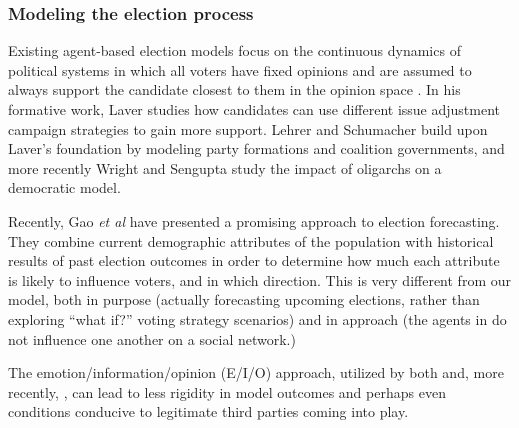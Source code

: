 


\subsubsection{Modeling the election process}

Existing agent-based election models focus on the continuous dynamics of
political systems in which all voters have fixed opinions and are assumed to 
always support the candidate closest to them in the opinion space \cite{kollman_adaptive_1992, laver_policy_2005, lehrer_governator_2018, wright_modeling_2015}. In his formative work, Laver \cite{laver_policy_2005} studies how candidates can use different issue adjustment
campaign strategies to gain more support. Lehrer and Schumacher \cite{lehrer_governator_2018} build upon Laver's foundation by modeling party formations and coalition governments, and more recently Wright and Sengupta \cite{wright_modeling_2015} study the impact of oligarchs on a democratic model.


Recently, Gao \textit{et al}\cite{gao_forecasting_2022} have presented a
promising approach to election forecasting. They combine current demographic
attributes of the population with historical results of past election outcomes
in order to determine how much each attribute is likely to influence voters,
and in which direction. This is very different from our model, both in purpose
(actually forecasting upcoming elections, rather than exploring ``what if?''
voting strategy scenarios) and in approach (the agents in
\cite{gao_forecasting_2022} do not influence one another on a social network.)

The emotion/information/opinion (E/I/O) approach, utilized by both
\cite{sobkowicz_quantitative_2016} and, more recently,
\cite{burke_quantitatively_2022}, can lead to less rigidity in model outcomes
and perhaps even conditions conducive to legitimate third parties coming into
play.


